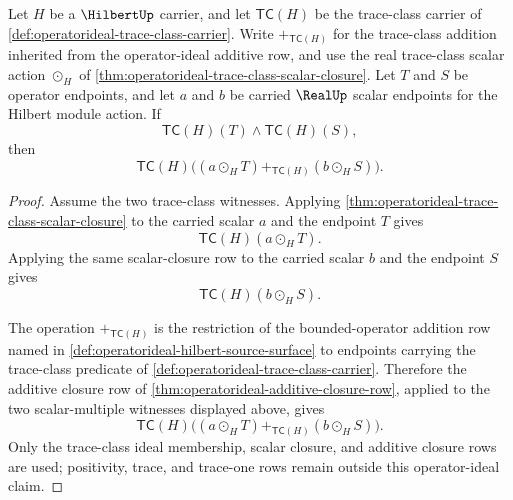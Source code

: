 \begin{theorem}
\label{thm:operatorideal-trace-class-binary-linear-combination-closure}
Let $H$ be a $\HilbertUp$ carrier, and let $\mathsf{TC}(H)$ be the trace-class carrier of \autoref{def:operatorideal-trace-class-carrier}. Write $+_{\mathsf{TC}(H)}$ for the trace-class addition inherited from the operator-ideal additive row, and use the real trace-class scalar action $\odot_H$ of \autoref{thm:operatorideal-trace-class-scalar-closure}. Let $T$ and $S$ be operator endpoints, and let $a$ and $b$ be carried $\RealUp$ scalar endpoints for the Hilbert module action. If
$$
\mathsf{TC}(H)(T)\land\mathsf{TC}(H)(S),
$$
then
$$
\mathsf{TC}(H)\bigl((a\odot_H T)+_{\mathsf{TC}(H)}(b\odot_H S)\bigr).
$$
\end{theorem}
\begin{proof}
Assume the two trace-class witnesses. Applying \autoref{thm:operatorideal-trace-class-scalar-closure} to the carried scalar $a$ and the endpoint $T$ gives
$$
\mathsf{TC}(H)(a\odot_H T).
$$
Applying the same scalar-closure row to the carried scalar $b$ and the endpoint $S$ gives
$$
\mathsf{TC}(H)(b\odot_H S).
$$

The operation $+_{\mathsf{TC}(H)}$ is the restriction of the bounded-operator addition row named in \autoref{def:operatorideal-hilbert-source-surface} to endpoints carrying the trace-class predicate of \autoref{def:operatorideal-trace-class-carrier}. Therefore the additive closure row of \autoref{thm:operatorideal-additive-closure-row}, applied to the two scalar-multiple witnesses displayed above, gives
$$
\mathsf{TC}(H)\bigl((a\odot_H T)+_{\mathsf{TC}(H)}(b\odot_H S)\bigr).
$$
Only the trace-class ideal membership, scalar closure, and additive closure rows are used; positivity, trace, and trace-one rows remain outside this operator-ideal claim.
\end{proof}

